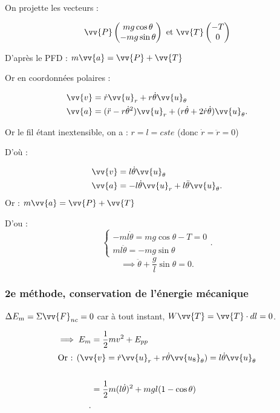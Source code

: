 On projette les vecteurs : \par
\begin{equation*}
   \vv{P}\begin{pmatrix} mg \cos\theta \\ -mg \sin\theta \end{pmatrix} \text{ et } \vv{T}\begin{pmatrix} -T\\ 0 \end{pmatrix} 
\end{equation*}

D'après le PFD : \(m\vv{a} = \vv{P}+\vv{T}\)\par
Or en coordonnées polaires : 


\begin{align*}
    \vv{v} &= \dot{r}\vv{u}_r + r\dot{\theta}\vv{u}_\theta\\
    \vv{a} &= (\ddot{r}-r\dot{\theta}^2)\vv{u}_r + (r\dot{\theta} + 2\dot{r}\dot{\theta})\vv{u}_\theta 
.\end{align*}


Or le fil étant inextensible, on a : \(r = l = cste\) (donc \(\dot{r} = \ddot{r} = 0\))\par
D'où : 

\begin{align*}
    \vv{v} &= l\dot{\theta} \vv{u}_\theta \\
    \vv{a} &= -l\dot{\theta}\vv{u}_r + l\ddot{\theta}\vv{u}_\theta 
.\end{align*}
Or : \(m\vv{a} = \vv{P}+\vv{T}\)\par
D'ou : 
\[
\begin{cases}
    -ml\dot{\theta} = mg \cos \theta -T = 0\\
    ml\ddot{\theta} = -mg\sin \theta 
\end{cases}
.\] 
\[
\implies \ddot{\theta}+\frac{g}{l}\sin \theta = 0
.\] 

\subsubsection{2e méthode, conservation de l'énergie mécanique}

\(\Delta E_m = \Sigma \vv{F}_{nc} = 0\) car à tout instant, \(W\vv{T} = \vv{T}\cdot dl = 0\). \par



\begin{align*}
   \implies E_m &= \frac{1}{2}mv^2 + E_{pp}\\
   \intertext{Or : $(\vv{v} = \dot{r}\vv{u}_r +r\dot{\theta}\vv{u_8}_\theta) = l\dot{\theta}\vv{u}_\theta $}\\
    &= \frac{1}{2}m(l\dot{\theta})^2 +mgl(1-\cos\theta) \\
.\end{align*}

